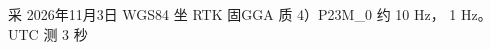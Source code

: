 \documentclass[11pt,a4paper]{article}
\numberwithin{equation}{section}
\numberwithin{figure}{section}
\begin{document}
{\cjkfont 采}\allowbreak{} 2026{\cjkfont 年}\allowbreak{}11{\cjkfont 月}\allowbreak{}3{\cjkfont 日}\allowbreak{} WGS84 {\cjkfont 坐}\allowbreak{} RTK {\cjkfont 固}\allowbreak{}GGA {\cjkfont 质}\allowbreak{} 4{\cjkfont ）}\allowbreak{}P23M\_0 {\cjkfont 约}\allowbreak{} 10 Hz{\cjkfont ，}\allowbreak{} 1 Hz{\cjkfont 。}\allowbreak{} UTC {\cjkfont 测}\allowbreak{} 3 {\cjkfont 秒}\allowbreak{}
\end{document}
